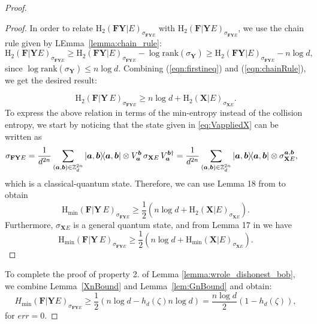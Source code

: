 \begin{proof}
\begin{proof}
In order to relate $\text{H}_2(\mathbf{F}\mathbf{Y} | E)_{\sigma_{\mathbf{F}\mathbf{Y} E}}$ with $\text{H}_2(\mathbf{F} | \mathbf{Y} E)_{\sigma_{\mathbf{F}\mathbf{Y} E}}$, we use the chain rule given by LEmma~\ref{lemma:chain_rule}:
\begin{equation}
\text{H}_2(\mathbf{F} | \mathbf{Y} E)_{\sigma_{\mathbf{F}\mathbf{Y} E}} \geq \text{H}_2(\mathbf{F}\mathbf{Y} | E)_{\sigma_{\mathbf{F}\mathbf{Y} E}} - \log \text{rank}(\sigma_{\mathbf{Y}}) \geq \text{H}_2(\mathbf{F}\mathbf{Y} | E)_{\sigma_{\mathbf{F}\mathbf{Y} E}} - n \log d,
 \label{eqn:chainRule} 
\end{equation}
since $\log \text{rank}(\sigma_{\mathbf{Y}}) \leq n \log d$. Combining (\ref{eqn:firstineq}) and (\ref{eqn:chainRule}), we get the desired result:

\begin{equation*}
    \text{H}_2(\mathbf{F}|\mathbf{Y}\, E)_{\sigma_{\mathbf{F}\mathbf{Y} E}} \geq n\log d + \text{H}_2(\mathbf{X}| E)_{\sigma_{\mathbf{X} E}}.
\end{equation*}
To express the above relation in terms of the min-entropy instead of the collision entropy, we start by noticing that 
 the state given in \eqref{eq:VappliedX} can be written as 
\begin{align}
  \sigma_{\mathbf{F}\mathbf{Y} E} &= \frac{1}{d^{2n}} \sum_{(\bm{a}, \bm{b}) \in \mathbb{Z}^{2n}_d} \ketbra{\bm{a},\bm{b}}\otimes V^{\bm{b}}_{\bm{a}} \, \sigma_{\mathbf{X} E}\,  V^{\bm{b}\dagger}_{\bm{a}} = \frac{1}{d^{2n}} \sum_{(\bm{a}, \bm{b}) \in \mathbb{Z}^{2n}_d} \ketbra{\bm{a},\bm{b}}\otimes \sigma_{\mathbf{X} E}^{\bm{a},\bm{b}},
\end{align}
which is a classical-quantum state. Therefore, we can use Lemma 18 from \cite{Dupuis2015} to obtain
\begin{equation*}
     \text{H}_{\text{min}}(\mathbf{F}|\mathbf{Y}\, E)_{\sigma_{\mathbf{F}\mathbf{Y} E}}  \geq \frac{1}{2}\left(n\log d + \text{H}_2(\mathbf{X}| E)_{\sigma_{\mathbf{X} E}}\right).
\end{equation*}
Furthermore,  $\sigma_{\mathbf{X}E}$  is a general quantum state, and from Lemma 17 in \cite{Dupuis2015} we have 
\begin{equation*}
    \text{H}_{\text{min}}(\mathbf{F}|\mathbf{Y}\, E)_{\sigma_{\mathbf{F}\mathbf{Y} E}}  \geq \frac{1}{2}\left(n\log d + \text{H}_{\text{min}}(\mathbf{X}| E)_{\sigma_{\mathbf{X} E}} \right).
\end{equation*}
\end{proof}



To complete the proof of property 2. of Lemma \ref{lemma:wrole_dishonest_bob}, we  combine Lemma~\ref{XnBound} and Lemma~\ref{lem:GnBound}  and obtain:
\begin{equation*}
H_{\min}(\mathbf{F} | \mathbf{Y} E)_{\sigma_{\mathbf{F}\mathbf{Y} E}} \geq \frac{1}{2}(n\log d - h_d(\zeta)n\log d) = \frac{n\log d}{2}(1 - h_d(\zeta)),
\end{equation*}
for $err = 0$.

\end{proof}

